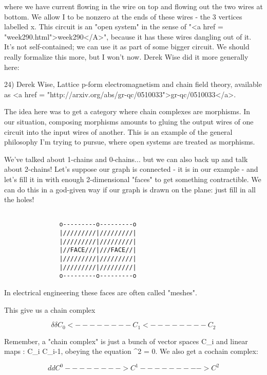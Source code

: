 where we have current flowing in the wire on top and flowing out the
two wires at bottom.  We allow \delta I to be nonzero at the ends
of these wires - the 3 vertices labelled x.  This circuit is an
"open system" in the sense of "<a href =
"week290.html">week290</A>", because it has these wires dangling
out of it.  It's not self-contained; we can use it as part of some
bigger circuit.  We should really formalize this more, but I won't now.
Derek Wise did it more generally here:

24) Derek Wise, Lattice p-form electromagnetism and chain field theory,
available as <a href = "http://arxiv.org/abs/gr-qc/0510033">gr-qc/0510033</a>.

The idea here was to get a category where chain complexes are
morphisms.  In our situation, composing morphisms amounts to gluing
the output wires of one circuit into the input wires of another.  This
is an example of the general philosophy I'm trying to pursue, where
open systems are treated as morphisms.  

We've talked about 1-chains and 0-chains... but we can also back up and
talk about 2-chains!  Let's suppose our graph is connected - it is in
our example - and let's fill it in with enough 2-dimensional
"faces" to get something contractible.  We can do this in a
god-given way if our graph is drawn on the plane: just fill in all the
holes!


\begin{verbatim}

               o---------o---------o
               |/////////|/////////| 
               |/////////|/////////| 
               |//FACE///|///FACE//| 
               |/////////|/////////| 
               |/////////|/////////| 
               o---------o---------o
\end{verbatim}
    

In electrical engineering these faces are often called
"meshes".

This give us a chain complex


$$

        \delta            \delta 
C_{0} <-------- C_{1} <-------- C_{2}
$$
    

Remember, a "chain complex" is just a bunch of vector spaces C_{i} and linear maps \delta : C_{i} \to  C_{i-1}, obeying the equation \delta ^{2} = 0.  We also get a cochain complex:


$$

       d           d
C^{0} --------> C^{1} ---------> C^{2}
$$
    

